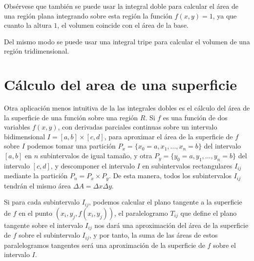 \documentclass[
  a4paper,
]{scrreport}
\theoremstyle{definition}
\theoremstyle{definition}
\theoremstyle{definition}
\theoremstyle{plain}
\theoremstyle{plain}
\theoremstyle{plain}
\theoremstyle{remark}
\begin{document}
\begin{tcolorbox}[enhanced jigsaw, bottomtitle=1mm, title=\textcolor{quarto-callout-tip-color}{\faLightbulb}\hspace{0.5em}{Tip}, colbacktitle=quarto-callout-tip-color!10!white, coltitle=black, leftrule=.75mm, colback=white, toptitle=1mm, toprule=.15mm, titlerule=0mm, opacitybacktitle=0.6, colframe=quarto-callout-tip-color-frame, bottomrule=.15mm, arc=.35mm, rightrule=.15mm, breakable, left=2mm, opacityback=0]

Obsérvese que también se puede usar la integral doble para calcular el
área de una región plana integrando sobre esta región la función
\(f(x,y)=1\), ya que cuanto la altura \(1\), el volumen coincide con el
área de la base.

Del mismo modo se puede usar una integral tripe para calcular el volumen
de una región tridimensional.

\end{tcolorbox}

\section{Cálculo del area de una
superficie}\label{cuxe1lculo-del-area-de-una-superficie}

Otra aplicación menos intuitiva de la las integrales dobles es el
cálculo del área de la superficie de una función sobre una región \(R\).
Si \(f\) es una función de dos variables \(f(x,y)\), con derivadas
parciales continuas sobre un intervalo bidimensional
\(I=[a,b]\times[c,d]\), para aproximar el área de la superficie de \(f\)
sobre \(I\) podemos tomar una partición
\(P_x=\{x_0=a,x_1,\ldots, x_n=b\}\) del intervalo \([a,b]\) en \(n\)
subintervalos de igual tamaño, y otra
\(P_y=\{y_0=a,y_1,\ldots, y_n=b\}\) del intervalo \([c,d]\), y
descomponer el intervalo \(I\) en subintervalos rectangulares \(I_{ij}\)
mediante la partición \(P_n=P_x\times P_y\). De esta manera, todos los
subintervalos \(I_{ij}\) tendrán el mismo área
\(\Delta A = \Delta x\Delta y\).

Si para cada subintervalo \(I_{ij}\), podemos calcular el plano tangente
a la superficie de \(f\) en el punto \((x_i, y_j, f(x_i,y_j))\), el
paralelogramo \(T_{ij}\) que define el plano tangente sobre el intervalo
\(I_{ij}\) nos dará una aproximación del área de la superficie de \(f\)
sobre el subintervalo \(I_{ij}\), y por tanto, la suma de las áreas de
estos paralelogramos tangentes será una aproximación de la superficie de
\(f\) sobre el intervalo \(I\).
\end{document}
